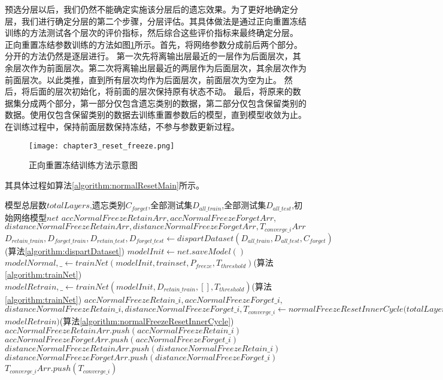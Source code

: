 预选分层以后，我们仍然不能确定实施该分层后的遗忘效果。为了更好地确定分层，我们进行确定分层的第二个步骤，分层评估。其具体做法是通过正向重置冻结训练的方法测试各个层次的评价指标，然后综合这些评价指标来最终确定分层。
正向重置冻结参数训练的方法如图\ref{fig:chapter3_reset_freeze}所示。首先，将网络参数分成前后两个部分。分开的方法仍然是逐层进行。
第一次先将离输出层最近的一层作为后面层次，其余层次作为前面层次。第二次将离输出层最近的两层作为后面层次，其余层次作为前面层次。以此类推，直到所有层次均作为后面层次，前面层次为空为止。
然后，将后面的层次初始化，将前面的层次保持原有状态不动。
最后，将原来的数据集分成两个部分，第一部分仅包含遗忘类别的数据，第二部分仅包含保留类别的数据。使用仅包含保留类别的数据去训练重置参数后的模型，直到模型收敛为止。在训练过程中，保持前面层数保持冻结，不参与参数更新过程。
\begin{figure}
    \centering
    \texttt{[image: chapter3\_reset\_freeze.png]}
    \caption{正向重置冻结训练方法示意图}
    \label{fig:chapter3_reset_freeze}
\end{figure}
其具体过程如算法\ref{algorithm:normalResetMain}所示。
\begin{algorithm}
	\renewcommand{\algorithmicrequire}{\textbf{Input:}}
	\renewcommand{\algorithmicensure}{\textbf{Output:}}
	\caption{正向冻结算法-外循环 normalResetMain}
	\label{algorithm:normalResetMain}
	\begin{algorithmic}[1]
        \REQUIRE 模型总层数$totalLayers$,遗忘类别$C_{forget}$,全部测试集$D_{all\_train}$,全部测试集$D_{all\_test}$,初始网络模型$net$
        \ENSURE  $accNormalFreezeRetainArr,accNormalFreezeForgetArr,$\\$distanceNormalFreezeRetainArr,distanceNormalFreezeForgetArr,T_{converge\_i}Arr$
        \STATE $D_{retain\_train}, D_{forget\_train}, D_{retain\_test}, D_{forget\_test} \gets dispartDataset(D_{all\_train}, D_{all\_test}, C_{forget})$(算法\ref{algorithm:dispartDataset})
        \STATE $modelInit \gets net.saveModel()$
        \STATE $modelNormal,\_ \gets trainNet(modelInit, trainset, P_{freeze}, T_{threshold})$(算法\ref{algorithm:trainNet})
        \STATE $modelRetrain,\_ \gets trainNet(modelInit, D_{retain\_train}, [], T_{threshold})$(算法\ref{algorithm:trainNet})
            \STATE $accNormalFreezeRetain\_i,accNormalFreezeForget\_i,$\\
            $distanceNormalFreezeRetain\_i,distanceNormalFreezeForget\_i,T_{converge\_i} \gets normalFreezeResetInnerCycle(totalLayers, i, C_{forget}, D_{retain\_train}, D_{retain\_test}, D_{forget\_test}, $\\$modelRetrain)$(算法\ref{algorithm:normalFreezeResetInnerCycle})
            \STATE $accNormalFreezeRetainArr.push(accNormalFreezeRetain\_i)$
            \STATE $accNormalFreezeForgetArr.push(accNormalFreezeForget\_i)$
            \STATE $distanceNormalFreezeRetainArr.push(distanceNormalFreezeRetain\_i)$
            \STATE $distanceNormalFreezeForgetArr.push(distanceNormalFreezeForget\_i)$
            \STATE $T_{converge\_i}Arr.push(T_{converge\_i})$
            \ENDFOR
	\end{algorithmic}  
\end{algorithm}
